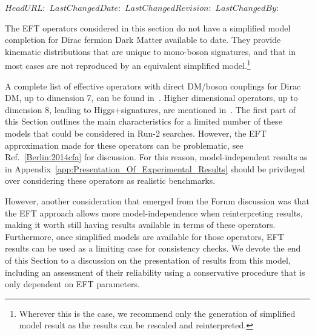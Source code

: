 \svnidlong
{$HeadURL: $}
{$LastChangedDate: $}
{$LastChangedRevision: $}
{$LastChangedBy: $}


The EFT operators considered in this section do not have a simplified model
completion for Dirac fermion Dark Matter available to date. 
They provide kinematic distributions that 
are unique to mono-boson signatures, and that in most cases 
are not reproduced by an equivalent simplified model.\footnote{Wherever this is
the case, we recommend only the generation of simplified model result as the results can be rescaled
and reinterpreted.}

A complete list of effective operators with direct DM/boson couplings for
Dirac DM, up to dimension 7, can be found in~\cite{Cotta:2012nj, Carpenter:2012rg, Crivellin:2015wva}. 
Higher dimensional operators, up to dimension 8, leading to Higgs+\MET signatures,
are mentioned in~\cite{Carpenter:2012rg, Berlin:2014cfa}. The first part of this Section outlines
the main characteristics for a limited number of these models that could be 
considered in Run-2 searches. 
However, the EFT approximation made for these operators can be problematic, see Ref.~\ref{Berlin:2014cfa} for discussion.
For this reason, model-independent results as in Appendix~\ref{app:Presentation_Of_Experimental_Results} 
should be privileged over considering these operators as realistic benchmarks. 

However, another consideration that emerged from the Forum discussion was that the EFT approach allows
more model-independence when reinterpreting results, making it worth still having
results available in terms of these operators. Furthermore, once simplified models are available
for those operators, EFT results can be used as a limiting case for consistency checks. 
We devote the end of this Section to a discussion on the presentation of results 
from this model, including an assessment of their reliability 
using a conservative procedure that is only dependent on EFT parameters.


